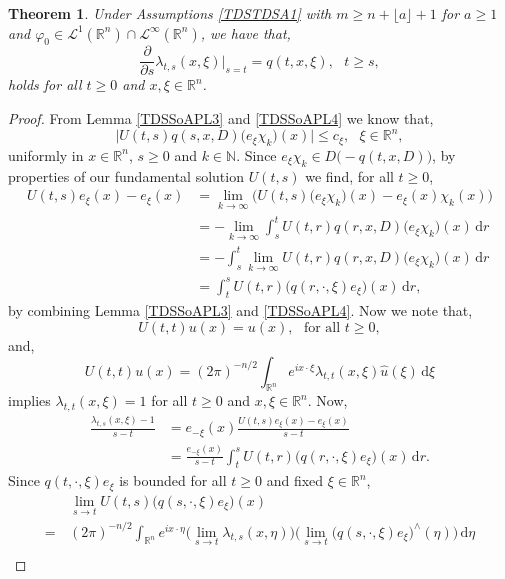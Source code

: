 \documentclass[a4paper, 12pt]{report}
\newtheorem{theorem}{Theorem}[section]
\theoremstyle{cor}
\theoremstyle{remark}
\theoremstyle{definition}
\begin{document}
\begin{theorem}\label{TDSSoAPT3}
Under Assumptions \ref{TDSTDSA1} with $m \ge n + \lfloor a \rfloor + 1$ for $a \ge 1$ and $\varphi_0 \in \mathcal{L}^1(\mathbb{R}^n) \cap \mathcal{L}^\infty(\mathbb{R}^n)$, we have that,
\begin{equation}
\frac{\partial}{\partial s}\lambda_{t, s}(x, \xi)\bigg|_{s = t} = q(t, x, \xi), \,\,\,\, t \ge s,
\end{equation}
holds for all $t \ge 0$ and $x, \xi \in \mathbb{R}^n$.
\end{theorem}
\begin{proof}
From Lemma \ref{TDSSoAPL3} and \ref{TDSSoAPL4} we know that,
$$
\big|U(t, s)q(s, x, D)\big(e_\xi\chi_k\big)(x)\big| \le c_\xi, \,\,\,\, \xi \in \mathbb{R}^n,
$$
uniformly in $x \in \mathbb{R}^n$, $s \ge 0$ and $k \in \mathbb{N}$.  Since $e_\xi\chi_k \in D\big(-q(t, x, D)\big)$, by properties of our fundamental solution $U(t, s)$ we find, for all $t \ge 0$,
$$
\begin{aligned}
U(t, s)e_\xi(x) - e_\xi(x) & = \lim_{k \to \infty}\big(U(t, s)\big(e_\xi\chi_k\big)(x) - e_\xi(x)\chi_k(x)\big)\\
& = -\lim_{k \to \infty}\int_s^tU(t, r)q(r, x, D)\big(e_\xi\chi_k\big)(x)\,\mathrm{d}r\\
& = -\int_s^t\lim_{k \to \infty}U(t, r)q(r, x, D)\big(e_\xi\chi_k\big)(x)\,\mathrm{d}r\\
& = \int_t^sU(t, r)\big(q(r, \cdot, \xi)e_\xi\big)(x)\,\mathrm{d}r,
\end{aligned}
$$
by combining Lemma \ref{TDSSoAPL3} and \ref{TDSSoAPL4}.  Now we note that,
$$
U(t, t)u(x) = u(x), \,\,\,\, \text{for all } t \ge 0,
$$
and,
$$
U(t, t)u(x) = (2\pi)^{-n/2}\int_{\mathbb{R}^n}e^{ix\cdot\xi}\lambda_{t, t}(x, \xi)\hat{u}(\xi)\,\mathrm{d}\xi
$$
implies $\lambda_{t, t}(x, \xi) = 1$ for all $t \ge 0$ and $x, \xi \in \mathbb{R}^n$.  Now,
$$
\begin{aligned}
\frac{\lambda_{t, s}(x, \xi) - 1}{s - t} & = e_{-\xi}(x)\frac{U(t, s)e_\xi(x) - e_\xi(x)}{s - t}\\
& = \frac{e_{-\xi}(x)}{s - t}\int_t^sU(t, r)\big(q(r, \cdot, \xi)e_\xi\big)(x)\,\mathrm{d}r.
\end{aligned}
$$
Since $q(t, \cdot, \xi)e_\xi$ is bounded for all $t \ge 0$ and fixed $\xi \in \mathbb{R}^n$, 
$$
\begin{aligned}
& \, \lim_{s \to t}U(t, s)\big(q(s, \cdot, \xi)e_\xi\big)(x)\\
= & \, (2\pi)^{-n/2}\int_{\mathbb{R}^n}e^{ix\cdot\eta}\Big(\lim_{s \to t}\lambda_{t, s}(x, \eta)\Big)\Big(\lim_{s \to t}\big(q(s, \cdot, \xi)e_\xi\big)^\wedge(\eta)\Big)\,\mathrm{d}\eta\\

\end{aligned}$$
\end{proof}
\end{document}
